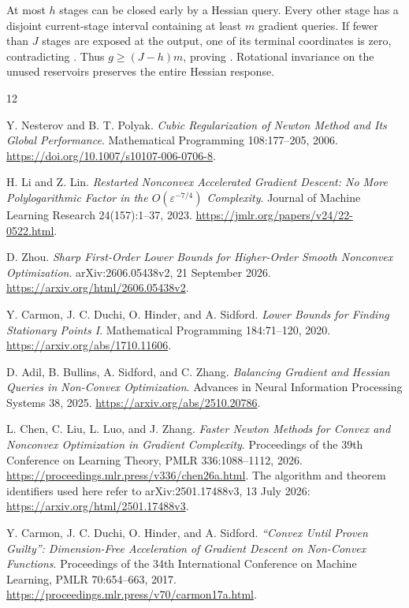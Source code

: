 \documentclass[11pt]{article}
\theoremstyle{remark}
\theoremstyle{remark}
\newcommand{\eps}{\varepsilon}
\begin{document}
At most $h$ stages can be closed early by a Hessian query.  Every other
stage has a disjoint current-stage interval containing at least $m$
gradient queries.  If fewer than $J$ stages are exposed at the output,
one of its terminal coordinates is zero, contradicting
.  Thus
$g\ge(J-h)m$, proving . Rotational invariance
on the unused reservoirs preserves the entire Hessian response.


\clearpage
\begin{thebibliography}{12}

Y. Nesterov and B. T. Polyak.
\emph{Cubic Regularization of Newton Method and Its Global Performance}.
Mathematical Programming 108:177--205, 2006.
\url{https://doi.org/10.1007/s10107-006-0706-8}.

H. Li and Z. Lin.
\emph{Restarted Nonconvex Accelerated Gradient Descent: No More Polylogarithmic Factor in the $O(\eps^{-7/4})$ Complexity}.
Journal of Machine Learning Research 24(157):1--37, 2023.
\url{https://jmlr.org/papers/v24/22-0522.html}.

D. Zhou.
\emph{Sharp First-Order Lower Bounds for Higher-Order Smooth Nonconvex Optimization}.
arXiv:2606.05438v2, 21 September 2026.
\url{https://arxiv.org/html/2606.05438v2}.

Y. Carmon, J. C. Duchi, O. Hinder, and A. Sidford.
\emph{Lower Bounds for Finding Stationary Points I}.
Mathematical Programming 184:71--120, 2020.
\url{https://arxiv.org/abs/1710.11606}.

D. Adil, B. Bullins, A. Sidford, and C. Zhang.
\emph{Balancing Gradient and Hessian Queries in Non-Convex Optimization}.
Advances in Neural Information Processing Systems 38, 2025.
\url{https://arxiv.org/abs/2510.20786}.

L. Chen, C. Liu, L. Luo, and J. Zhang.
\emph{Faster Newton Methods for Convex and Nonconvex Optimization in Gradient Complexity}.
Proceedings of the 39th Conference on Learning Theory,
PMLR 336:1088--1112, 2026.
\url{https://proceedings.mlr.press/v336/chen26a.html}.
The algorithm and theorem identifiers used here refer to
arXiv:2501.17488v3, 13 July 2026:
\url{https://arxiv.org/html/2501.17488v3}.

Y. Carmon, J. C. Duchi, O. Hinder, and A. Sidford.
\emph{``Convex Until Proven Guilty'': Dimension-Free Acceleration of Gradient Descent on Non-Convex Functions}.
Proceedings of the 34th International Conference on Machine Learning,
PMLR 70:654--663, 2017.
\url{https://proceedings.mlr.press/v70/carmon17a.html}.


\end{thebibliography}
\end{document}

